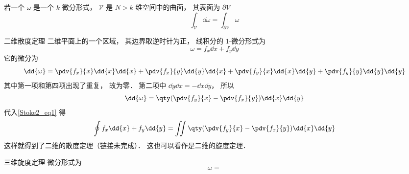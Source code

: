 

若一个 $\omega$ 是一个 $k$ 微分形式， $\mathcal V$ 是 $N> k$ 维空间中的曲面， 其表面为 $\partial \mathcal V$
\begin{equation}\label{Stoke2_eq1}
\int_{\mathcal V} \dd{\omega} = \int_{\partial \mathcal V} \omega
\end{equation}


\begin{example}{二维散度定理}
二维平面上的一个区域， 其边界取逆时针为正， 线积分的 $1$-微分形式为
\begin{equation}
\omega = f_x \dd{x} + f_y \dd{y}
\end{equation}
它的微分为
\begin{equation}
\dd{\omega} = \pdv{f_x}{x}\dd{x}\dd{x} + \pdv{f_x}{y}\dd{y}\dd{x}
+ \pdv{f_y}{x}\dd{x}\dd{y} + \pdv{f_y}{y}\dd{y}\dd{y}
\end{equation}
其中第一项和第四项出现了重复， 故为零． 第二项中 $\dd{y}\dd{x} = -\dd{x}\dd{y}$， 所以
\begin{equation}
\dd{\omega} = \qty(\pdv{f_y}{x}-\pdv{f_x}{y})\dd{x}\dd{y}
\end{equation}
代入\autoref{Stoke2_eq1} 得
\begin{equation}
\oint f_x \dd{x} + f_y \dd{y} = \iint \qty(\pdv{f_y}{x}-\pdv{f_x}{y})\dd{x}\dd{y}
\end{equation}
这样就得到了二维的散度定理（链接未完成）． 这也可以看作是二维的旋度定理．
\end{example}

\begin{example}{三维旋度定理}
微分形式为
\begin{equation}
\omega = 
\end{equation}

\end{example}
